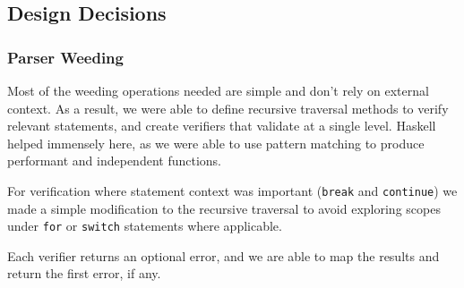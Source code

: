 \documentclass[11pt]{article}
\begin{document}
\subsection{Design Decisions}
\subsubsection{Parser Weeding}
Most of the weeding operations needed are simple and don't rely
on external context. As a result, we were able to define recursive
traversal methods to verify relevant statements, and create verifiers
that validate at a single level. Haskell helped immensely here, as
we were able to use pattern matching to produce performant and
independent functions.

For verification where statement context was important (\texttt{break} and
\texttt{continue}) we made a simple modification to the recursive traversal
to avoid exploring scopes under \texttt{for} or \texttt{switch} statements
where applicable.

Each verifier returns an optional error, and we are able to map the
results and return the first error, if any.
\end{document}
